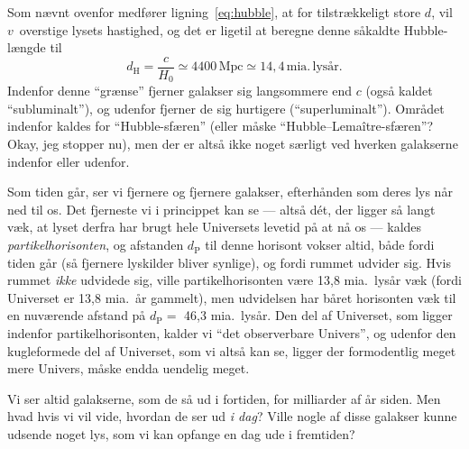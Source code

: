 \documentclass[useAMS,danish]{aa}
\def\vrec{\mbox{$v$}}
\begin{document}
Som nævnt ovenfor medfører ligning~\ref{eq:hubble}, at for tilstrækkeligt store $d$, vil \vrec\ overstige lysets hastighed, og det er ligetil at beregne denne såkaldte Hubble-længde til
\begin{equation}
    \label{eq:dH}
    d_\mathrm{H} = \frac{c}{H_0}
                \simeq 4400\,\mathrm{Mpc}
                \simeq 14,4\,\mathrm{mia.\,lysår}.
\end{equation}
Indenfor denne ``grænse'' fjerner galakser sig langsommere end $c$ (også kaldet ``subluminalt''), og udenfor fjerner de sig hurtigere (``superluminalt'').
Området indenfor kaldes for ``Hubble-sfæren'' (eller måske ``Hubble--Lemaître-sfæren''? Okay, jeg stopper nu), men der er altså ikke noget særligt ved hverken galakserne indenfor eller udenfor.

Som tiden går, ser vi fjernere og fjernere galakser, efterhånden som deres lys når ned til os.
Det fjerneste vi i princippet kan se --- altså dét, der ligger så langt væk, at lyset derfra har brugt hele Universets levetid på at nå os --- kaldes \emph{partikelhorisonten}, og afstanden $d_\mathrm{P}$ til denne horisont vokser altid, både fordi tiden går (så fjernere lyskilder bliver synlige), og fordi rummet udvider sig.
Hvis rummet \emph{ikke} udvidede sig, ville partikelhorisonten være 13,8 mia.~lysår væk (fordi Universet er 13,8 mia.~år gammelt), men udvidelsen har båret horisonten væk til en nuværende afstand på $d_\mathrm{P} =$ 46,3 mia.~lysår.
Den del af Universet, som ligger indenfor partikelhorisonten, kalder vi ``det observerbare Univers'', og udenfor den kugleformede del af Universet, som vi altså kan se, ligger der formodentlig meget mere Univers, måske endda uendelig meget.
%
\begin{figure}
    \caption*{{\sf {}}}
\end{figure}
%
Vi ser altid galakserne, som de så ud i fortiden, for milliarder af år siden.
Men hvad hvis vi vil vide, hvordan de ser ud \emph{i dag}?
Ville nogle af disse galakser kunne udsende noget lys, som vi kan opfange en dag ude i fremtiden?
\end{document}
